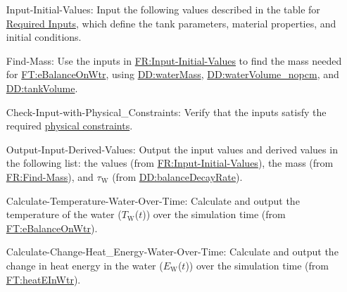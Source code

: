 \documentclass[12pt]{article}
\begin{document}
\begin{itemize}
\item[Input-Initial-Values:\phantomsection\label{inputInitVals}]{Input the following values described in the table for \hyperref[Table:ReqInputs]{Required Inputs}, which define the tank parameters, material properties, and initial conditions.}
\item[Find-Mass:\phantomsection\label{findMass}]{Use the inputs in \hyperref[inputInitVals]{FR:Input-Initial-Values} to find the mass needed for \hyperref[FT:eBalanceOnWtr]{FT:eBalanceOnWtr}, using \hyperref[DD:waterMass]{DD:waterMass}, \hyperref[DD:waterVolume.nopcm]{DD:waterVolume\_nopcm}, and \hyperref[DD:tankVolume]{DD:tankVolume}.}
\item[Check-Input-with-Physical\_Constraints:\phantomsection\label{checkWithPhysConsts}]{Verify that the inputs satisfy the required \hyperref[Sec:DataConstraints]{physical constraints}.}
\item[Output-Input-Derived-Values:\phantomsection\label{outputInputDerivVals}]{Output the input values and derived values in the following list: the values (from \hyperref[inputInitVals]{FR:Input-Initial-Values}), the mass (from \hyperref[findMass]{FR:Find-Mass}), and ${τ_{\text{W}}}$ (from \hyperref[DD:balanceDecayRate]{DD:balanceDecayRate}).}
\item[Calculate-Temperature-Water-Over-Time:\phantomsection\label{calcTempWtrOverTime}]{Calculate and output the temperature of the water (${T_{\text{W}}}$($t$)) over the simulation time (from \hyperref[FT:eBalanceOnWtr]{FT:eBalanceOnWtr}).}
\item[Calculate-Change-Heat\_Energy-Water-Over-Time:\phantomsection\label{calcChgHeatEnergyWtrOverTime}]{Calculate and output the change in heat energy in the water (${E_{\text{W}}}$($t$)) over the simulation time (from \hyperref[FT:heatEInWtr]{FT:heatEInWtr}).}
\end{itemize}
\end{document}
